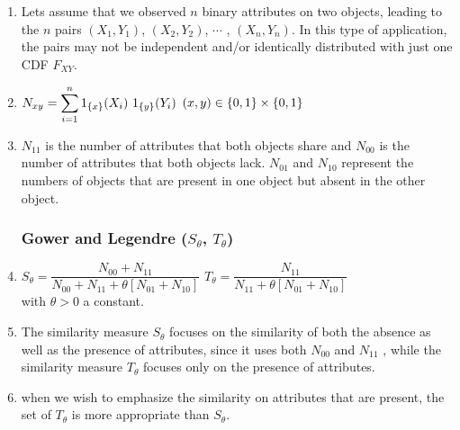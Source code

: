 \begin{enumerate}
    \item Lets assume that we observed $n$ binary attributes on two objects, leading to the $n$ pairs $(X_1, Y_1)$, $(X_2, Y_2)$, $\cdots$ , $(X_n , Y_n )$.
    In this type of application, the pairs may not be independent and/or identically distributed with just one CDF $F_{X Y }$.
    \hfill \cite{statistics/book/Statistics-for-Data-Scientists/Maurits-Kaptein}

    \item $N_{x y} = \displaystyle\sum^n_{i=1} 1_{\left\{x\right\}}(X_i )\ 1_{\left\{y\right\}}(Y_i )$
    \hfill
    $(x, y) \in \left\{0, 1\right\} \times \left\{0, 1\right\}$
    \hfill \cite{statistics/book/Statistics-for-Data-Scientists/Maurits-Kaptein}

    \item $N_{11}$ is the number of attributes that both objects share and $N_{00}$ is the number of attributes that both objects lack.
    $N_{01}$ and $N_{10}$ represent the numbers of objects that are present in one object but absent in the other object.
    \hfill \cite{statistics/book/Statistics-for-Data-Scientists/Maurits-Kaptein}

\subsubsection{Gower and Legendre ($S_\theta$, $T_\theta$)}

    \item
    $ S_\theta = \dfrac{N_{00} + N_{11}}{N_{00} + N_{11} + \theta[N_{01} + N_{10}]} $
    \hfill
    $ T_\theta = \dfrac{N_{11}}{N_{11} + \theta[N_{01} + N_{10}]} $
    \hfill \cite{statistics/book/Statistics-for-Data-Scientists/Maurits-Kaptein}
    \\[0.3cm]
    with $\theta > 0$ a constant.
    \hfill \cite{statistics/book/Statistics-for-Data-Scientists/Maurits-Kaptein}

    \item The similarity measure $S_\theta$ focuses on the similarity of both the absence as well as the presence of attributes, since it uses both $N_{00}$ and $N_{11}$ , while the similarity measure $T_\theta$ focuses only on the presence of attributes.
    \hfill \cite{statistics/book/Statistics-for-Data-Scientists/Maurits-Kaptein}

    \item when we wish to emphasize the similarity on attributes that are present, the set of $T_\theta$ is more appropriate than $S_\theta$.
    \hfill \cite{statistics/book/Statistics-for-Data-Scientists/Maurits-Kaptein}


\end{enumerate}
